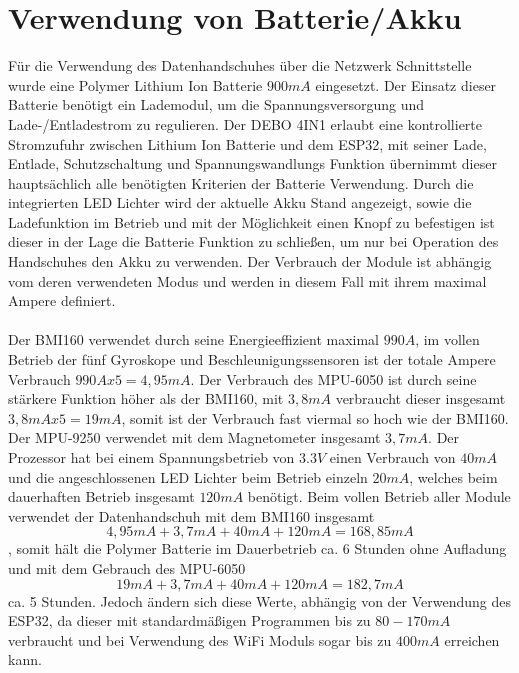 \section{Verwendung von Batterie/Akku}
Für die Verwendung des Datenhandschuhes über die Netzwerk Schnittstelle wurde eine Polymer Lithium Ion Batterie $900 mA$ eingesetzt.
Der Einsatz dieser Batterie benötigt ein Lademodul, um die Spannungsversorgung und Lade-/Entladestrom zu regulieren. Der DEBO 4IN1 erlaubt eine kontrollierte Stromzufuhr zwischen Lithium Ion Batterie und dem ESP32, mit seiner Lade, Entlade, Schutzschaltung und Spannungswandlungs Funktion übernimmt dieser hauptsächlich alle benötigten Kriterien der Batterie Verwendung. Durch die integrierten LED Lichter wird der aktuelle Akku Stand angezeigt, sowie die Ladefunktion im Betrieb und mit der Möglichkeit einen Knopf zu befestigen ist dieser in der Lage die Batterie Funktion zu schließen, um nur bei Operation des Handschuhes den Akku zu verwenden.
Der Verbrauch der Module ist abhängig vom deren verwendeten Modus und werden in diesem Fall mit ihrem maximal Ampere definiert. 
\\
\\
Der BMI160 verwendet durch seine Energieeffizient maximal $990${\textmu}$A$, im vollen Betrieb der fünf Gyroskope und Beschleunigungssensoren ist der totale Ampere Verbrauch $990${\textmu}$A x 5 = 4,95 mA$.
Der Verbrauch des MPU-6050 ist durch seine stärkere Funktion höher als der BMI160, mit $3,8 mA$ verbraucht dieser insgesamt $3,8 mA x 5 = 19 mA$, somit ist der Verbrauch fast viermal so hoch wie der BMI160. Der MPU-9250 verwendet mit dem Magnetometer insgesamt $3,7 mA$. Der Prozessor hat bei einem Spannungsbetrieb von $3.3 V$ einen Verbrauch von $40 mA$ und die angeschlossenen LED Lichter beim Betrieb einzeln $20mA$, welches beim dauerhaften Betrieb insgesamt $120 mA$ benötigt.
Beim vollen Betrieb aller Module verwendet der Datenhandschuh mit dem BMI160 insgesamt
$$4,95mA + 3,7mA + 40mA + 120mA = 168,85 mA$$,
somit hält die Polymer Batterie im Dauerbetrieb ca. 6 Stunden ohne Aufladung und mit dem Gebrauch des MPU-6050
$$19mA + 3,7mA + 40mA + 120mA = 182,7mA$$
ca. 5 Stunden. Jedoch ändern sich diese Werte, abhängig von der Verwendung des ESP32, da dieser mit standardmäßigen Programmen bis zu $80 - 170 mA$ verbraucht und bei Verwendung des WiFi Moduls sogar bis zu $400mA$ erreichen kann. 





\newpage

